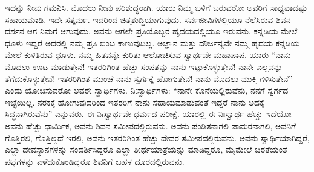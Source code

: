 ಇದನ್ನು ನೀವು ಗಮನಿಸಿ. ಮೊದಲು ನೀವು ಪರಿಶುದ್ಧರಾಗಿ. ಯಾರು ನಿಮ್ಮ ಬಳಿಗೆ ಬರುವರೋ ಅವರಿಗೆ ಸಾಧ್ಯವಾದಷ್ಟು ಸಹಾಯಮಾಡಿ. ಇದೇ ಸತ್ಕರ್ಮ. ಇದರಿಂದ ಚಿತ್ತಶುದ್ಧಿಯಾಗುವುದು. ಸರ್ವಜೀವಿಗಳಲ್ಲಿಯೂ ನೆಲೆಸಿರುವ ಶಿವನ ದರ್ಶನ ಆಗ ನಿಮಗೆ ಆಗುವುದು. ಅವನು ಆಗಲೇ ಪ್ರತಿಯೊಬ್ಬರ ಹೃದಯದಲ್ಲಿಯೂ ಇರುವನು. ಕನ್ನಡಿಯ ಮೇಲೆ ಧೂಳು ಇದ್ದರೆ ಅದರಲ್ಲಿ ನಮ್ಮ ಪ್ರತಿ ಬಿಂಬ ಕಾಣುವುದಿಲ್ಲ. ಅಜ್ಞಾನ ಮತ್ತು ದೌರ್ಜನ್ಯವೇ ನಮ್ಮ ಹೃದಯ ಕನ್ನಡಿಯ ಮೇಲೆ ಕುಳಿತಿರುವ ಧೂಳು. ನಮ್ಮ ಹಿತವನ್ನೇ ಕುರಿತು ಆಲೋಚಿಸುವ ಸ್ವಾರ್ಥವೇ ಮಹಾಪಾಪ. ಯಾರು “ನಾನು ಮೊದಲು ಊಟ ಮಾಡುತ್ತೇನೆ! ಇತರರಿಗಿಂತ ಹೆಚ್ಚು ಸಂಪತ್ತನ್ನು ನಾನು ಇಟ್ಟುಕೊಳ್ಳುತ್ತೇನೆ! ನಾನೇ ಎಲ್ಲವನ್ನು ತೆಗೆದುಕೊಳ್ಳುತ್ತೇನೆ! ಇತರರಿಗಿಂತ ಮುಂಚೆ ನಾನು ಸ್ವರ್ಗಕ್ಕೆ ಹೋಗುತ್ತೇನೆ! ನಾನು ಮೊದಲು ಮುಕ್ತಿ ಗಳಿಸುತ್ತೇನೆ” ಎಂದು ಯೋಚಿಸುವರೋ ಅವರೇ ಸ್ವಾರ್ಥಿಗಳು. ನಿಃಸ್ವಾರ್ಥಿಗಳು: “ನಾನೇ ಕೊನೆಯಲ್ಲಿರುವೆನು, ನನಗೆ ಸ್ವರ್ಗದ ಇಚ್ಛೆಯಿಲ್ಲ. ನರಕಕ್ಕೆ ಹೋಗುವುದರಿಂದ ಇತರರಿಗೆ ನಾನು ಸಹಾಯಮಾಡುವಂತೆ ಇದ್ದರೆ ನಾನು ಅದಕ್ಕೆ ಸಿದ್ಧನಾಗಿರುವೆನು” ಎನ್ನುವರು. ಈ ನಿಃಸ್ವಾರ್ಥವೇ ಧರ್ಮದ ಪರೀಕ್ಷೆ. ಯಾರಲ್ಲಿ ಈ ನಿಃಸ್ವಾರ್ಥ ಹೆಚ್ಚು ಇದೆಯೋ ಅವನು ಹೆಚ್ಚು ಧಾರ್ಮಿಕ, ಅವನು ಶಿವನ ಸಮೀಪದಲ್ಲಿರುವನು. ಅವನು ಪಂಡಿತನಾಗಲಿ ಪಾಮರನಾಗಲಿ, ಅವನಿಗೆ ಗೊತ್ತಿರಲಿ, ಗೊತ್ತಿಲ್ಲದೆ ಇರಲಿ, ಅವನು ಇತರರಿಗಿಂತ ಹೆಚ್ಚು ದೇವರ ಸಮೀಪದಲ್ಲಿರುವನು. ಅವನು ಸ್ವಾರ್ಥಿಯಾಗಿದ್ದರೆ, ಎಲ್ಲಾ ದೇವಸ್ಥಾನಗಳನ್ನು ಸಂದರ್ಶಿಸಿದ್ದರೂ ಎಲ್ಲಾ ತೀರ್ಥಯಾತ್ರೆಯನ್ನು ಮಾಡಿದ್ದರೂ, ಮೈಮೇಲೆ ಚಿರತೆಯಂತೆ ಪಟ್ಟೆಗಳನ್ನು ಎಳೆದುಕೊಂಡಿದ್ದರೂ ಶಿವನಿಗೆ ಬಹಳ ದೂರದಲ್ಲಿರುವನು. 

